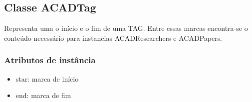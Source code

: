 \subsection{Classe ACADTag}

Representa uma o início e o fim de uma TAG. Entre essas marcas encontra-se o conteúdo necessário para instancias ACADResearchers e ACADPapers.

\subsubsection{Atributos de instância}

\begin{itemize}
  \item star: marca de início

  \item end: marca de fim

\end{itemize}
